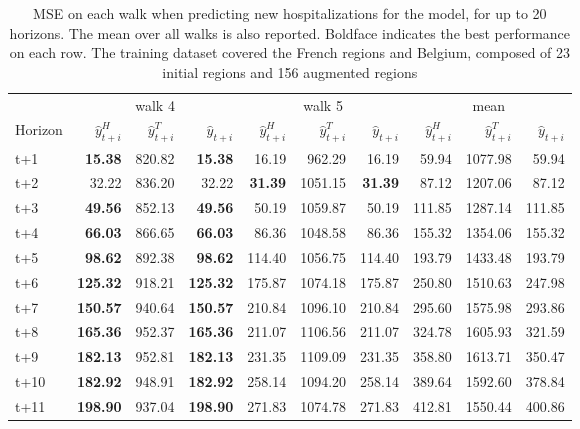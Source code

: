 \begin{table}[H]
\centering
\caption{MSE on each walk when predicting new hospitalizations for the model, for up to 20 horizons. The mean over all walks is also reported. Boldface indicates the best performance on each row. The training dataset covered the French regions and Belgium, composed of 23 initial regions and 156 augmented regions }
\label{tab:MSE_walk_assemble}
\begin{tabular}{lrrrrrrrrr}
\toprule
 & \multicolumn{3}{c}{walk 4} & \multicolumn{3}{c}{walk 5} & \multicolumn{3}{c}{mean} 
\\

\cmidrule(lr){2-4} \cmidrule(lr){5-7} \cmidrule(lr){8-10} 
Horizon & $\hat{y}_{t+i}^H$ & $\hat{y}_{t+i}^T$ & $\hat{y}_{t+i}$ & $\hat{y}_{t+i}^H$ & $\hat{y}_{t+i}^T$ & $\hat{y}_{t+i}$ & $\hat{y}_{t+i}^H$ & $\hat{y}_{t+i}^T$ & $\hat{y}_{t+i}$ \\
\midrule
t+1  & \textbf{15.38}  & 820.82  & \textbf{15.38}  & 16.19  & 962.29  & 16.19  & 59.94  & 1077.98  & 59.94  \\
t+2  & 32.22  & 836.20  & 32.22  & \textbf{31.39}  & 1051.15  & \textbf{31.39}  & 87.12  & 1207.06  & 87.12  \\
t+3  & \textbf{49.56}  & 852.13  & \textbf{49.56}  & 50.19  & 1059.87  & 50.19  & 111.85  & 1287.14  & 111.85  \\
t+4  & \textbf{66.03}  & 866.65  & \textbf{66.03}  & 86.36  & 1048.58  & 86.36  & 155.32  & 1354.06  & 155.32  \\
t+5  & \textbf{98.62}  & 892.38  & \textbf{98.62}  & 114.40  & 1056.75  & 114.40  & 193.79  & 1433.48  & 193.79  \\
t+6  & \textbf{125.32}  & 918.21  & \textbf{125.32}  & 175.87  & 1074.18  & 175.87  & 250.80  & 1510.63  & 247.98  \\
t+7  & \textbf{150.57}  & 940.64  & \textbf{150.57}  & 210.84  & 1096.10  & 210.84  & 295.60  & 1575.98  & 293.86  \\
t+8  & \textbf{165.36}  & 952.37  & \textbf{165.36}  & 211.07  & 1106.56  & 211.07  & 324.78  & 1605.93  & 321.59  \\
t+9  & \textbf{182.13}  & 952.81  & \textbf{182.13}  & 231.35  & 1109.09  & 231.35  & 358.80  & 1613.71  & 350.47  \\
t+10  & \textbf{182.92}  & 948.91  & \textbf{182.92}  & 258.14  & 1094.20  & 258.14  & 389.64  & 1592.60  & 378.84  \\
t+11  & \textbf{198.90}  & 937.04  & \textbf{198.90}  & 271.83  & 1074.78  & 271.83  & 412.81  & 1550.44  & 400.86  \\

\end{tabular}
\end{table}
